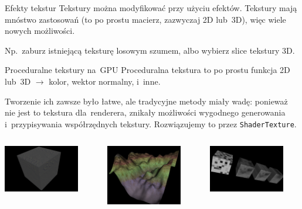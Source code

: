 \documentclass{beamer}
\begin{document}
\begin{frame}[fragile]{Efekty tekstur}
Tekstury można modyfikować przy użyciu efektów. Tekstury mają mnóstwo
zastosowań (to po prostu macierz, zazwyczaj 2D lub~3D), więc wiele nowych
możliwości.

\vspace{0.1in}

Np.~zaburz istniejącą teksturę losowym szumem, albo wybierz slice tekstury 3D.
\end{frame}

\begin{frame}[fragile]{Proceduralne tekstury na~GPU}
Proceduralna tekstura to po prostu funkcja 2D lub~3D $\rightarrow$
kolor, wektor normalny, i~inne.

\vspace{0.1in}

Tworzenie ich zawsze było łatwe, ale tradycyjne metody miały wadę:
ponieważ nie jest to tekstura dla~renderera, znikały możliwości wygodnego
generowania i~przypisywania współrzędnych tekstury. Rozwiązujemy to przez
\texttt{ShaderTexture}.

\begin{center}
\begin{columns}[T]
  \begin{column}{1in}
    \includegraphics[width=1.3in]{../shader_texture_edge_detection}
  \end{column}
  \begin{column}{1in}
    \includegraphics[width=1.3in]{../terrain}
  \end{column}
  \begin{column}{1in}
    \includegraphics[width=1.3in]{../noise}
  \end{column}
\end{columns}
\end{center}

\end{frame}
\end{document}
